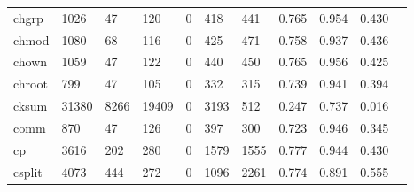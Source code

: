 \begin{longtable}{lp{1.10cm}p{1.10cm}p{1.10cm}p{1.10cm}p{1.10cm}p{1.10cm}p{1.10cm}p{1.10cm}p{1.10cm}p{1.10cm}}
chgrp     &                   1026 &                                 47 &                               120 &                                0 &                               418 &                             441 &                          0.765 &                                 0.954 &                               0.430 \\
chmod     &                   1080 &                                 68 &                               116 &                                0 &                               425 &                             471 &                          0.758 &                                 0.937 &                               0.436 \\
chown     &                   1059 &                                 47 &                               122 &                                0 &                               440 &                             450 &                          0.765 &                                 0.956 &                               0.425 \\
chroot    &                    799 &                                 47 &                               105 &                                0 &                               332 &                             315 &                          0.739 &                                 0.941 &                               0.394 \\
cksum     &                  31380 &                               8266 &                             19409 &                                0 &                              3193 &                             512 &                          0.247 &                                 0.737 &                               0.016 \\
comm      &                    870 &                                 47 &                               126 &                                0 &                               397 &                             300 &                          0.723 &                                 0.946 &                               0.345 \\
cp        &                   3616 &                                202 &                               280 &                                0 &                              1579 &                            1555 &                          0.777 &                                 0.944 &                               0.430 \\
csplit    &                   4073 &                                444 &                               272 &                                0 &                              1096 &                            2261 &                          0.774 &                                 0.891 &                               0.555 \\

\end{longtable}
